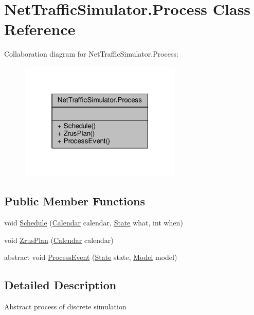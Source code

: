 \hypertarget{classNetTrafficSimulator_1_1Process}{\section{Net\-Traffic\-Simulator.\-Process Class Reference}
\label{classNetTrafficSimulator_1_1Process}
}


Collaboration diagram for Net\-Traffic\-Simulator.\-Process\-:
\nopagebreak
\begin{figure}[H]
\begin{center}
\leavevmode
\includegraphics[width=220pt]{classNetTrafficSimulator_1_1Process__coll__graph}
\end{center}
\end{figure}
\subsection*{Public Member Functions}
\begin{DoxyCompactItemize}
\item 
void \hyperlink{classNetTrafficSimulator_1_1Process_a5c11870364f84090871c01be442a9e6b}{Schedule} (\hyperlink{classNetTrafficSimulator_1_1Calendar}{Calendar} calendar, \hyperlink{namespaceNetTrafficSimulator_a32d3ec79cec8f7c31bf8659afcca45c8}{State} what, int when)
\item 
void \hyperlink{classNetTrafficSimulator_1_1Process_ad0bc21eeb4802dc148b4d79b5c91360d}{Zrus\-Plan} (\hyperlink{classNetTrafficSimulator_1_1Calendar}{Calendar} calendar)
\item 
abstract void \hyperlink{classNetTrafficSimulator_1_1Process_a11d227f1f17b73020927393515bb7333}{Process\-Event} (\hyperlink{namespaceNetTrafficSimulator_a32d3ec79cec8f7c31bf8659afcca45c8}{State} state, \hyperlink{classNetTrafficSimulator_1_1Model}{Model} model)
\end{DoxyCompactItemize}


\subsection{Detailed Description}
Abstract process of discrete simulation 

